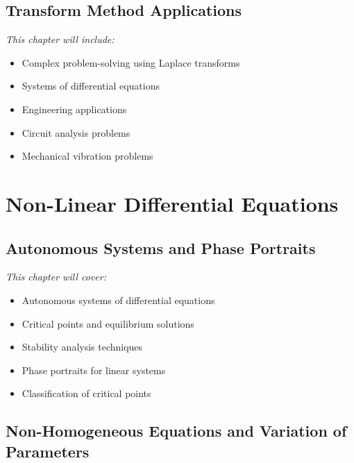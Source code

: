 \documentclass[12pt, letterpaper]{book}
\theoremstyle{problemstyle}
\theoremstyle{solutionstyle}
\begin{document}
\chapter{Transform Method Applications}
\label{chap:session_13}

\textit{This chapter will include:}
\begin{itemize}
    \item Complex problem-solving using Laplace transforms
    \item Systems of differential equations
    \item Engineering applications
    \item Circuit analysis problems
    \item Mechanical vibration problems
\end{itemize}

\part{Non-Linear Differential Equations}
\label{part:nonlinear_de}

\chapter{Autonomous Systems and Phase Portraits}
\label{chap:session_14}

\textit{This chapter will cover:}
\begin{itemize}
    \item Autonomous systems of differential equations
    \item Critical points and equilibrium solutions
    \item Stability analysis techniques
    \item Phase portraits for linear systems
    \item Classification of critical points
\end{itemize}

\chapter{Non-Homogeneous Equations and Variation of Parameters}
\label{chap:session_15}
\end{document}
